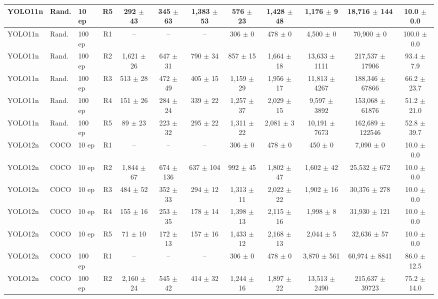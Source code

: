 \begin{table}[hbt!]
\begin{tabular}{lllccccccccc}
YOLO11n & Rand. & 10 ep & R5 & 292 $\pm$ 43 & 345 $\pm$ 63 & 1,383 $\pm$ 53 & 576 $\pm$ 23 & 1,428 $\pm$ 48 & 1,176 $\pm$ 9 & 18,716 $\pm$ 144 & 10.0 $\pm$ 0.0 \\
\midrule
YOLO11n & Rand. & 100 ep & R1 & {--} & {--} & {--} & 306 $\pm$ 0 & 478 $\pm$ 0 & 4,500 $\pm$ 0 & 70,900 $\pm$ 0 & 100.0 $\pm$ 0.0 \\
YOLO11n & Rand. & 100 ep & R2 & 1,621 $\pm$ 26 & 647 $\pm$ 31 & 790 $\pm$ 34 & 857 $\pm$ 15 & 1,664 $\pm$ 18 & 13,633 $\pm$ 1111 & 217,537 $\pm$ 17906 & 93.4 $\pm$ 7.9 \\
YOLO11n & Rand. & 100 ep & R3 & 513 $\pm$ 28 & 472 $\pm$ 49 & 405 $\pm$ 15 & 1,159 $\pm$ 29 & 1,956 $\pm$ 17 & 11,813 $\pm$ 4267 & 188,346 $\pm$ 67866 & 66.2 $\pm$ 23.7 \\
YOLO11n & Rand. & 100 ep & R4 & 151 $\pm$ 26 & 284 $\pm$ 24 & 339 $\pm$ 22 & 1,257 $\pm$ 37 & 2,029 $\pm$ 15 & 9,597 $\pm$ 3892 & 153,068 $\pm$ 61876 & 51.2 $\pm$ 21.0 \\
YOLO11n & Rand. & 100 ep & R5 & 89 $\pm$ 23 & 223 $\pm$ 32 & 295 $\pm$ 22 & 1,311 $\pm$ 22 & 2,081 $\pm$ 3 & 10,191 $\pm$ 7673 & 162,689 $\pm$ 122546 & 52.8 $\pm$ 39.7 \\
\midrule
YOLO12n & COCO & 10 ep & R1 & {--} & {--} & {--} & 306 $\pm$ 0 & 478 $\pm$ 0 & 450 $\pm$ 0 & 7,090 $\pm$ 0 & 10.0 $\pm$ 0.0 \\
YOLO12n & COCO & 10 ep & R2 & 1,844 $\pm$ 67 & 674 $\pm$ 136 & 637 $\pm$ 104 & 992 $\pm$ 45 & 1,802 $\pm$ 47 & 1,602 $\pm$ 42 & 25,532 $\pm$ 672 & 10.0 $\pm$ 0.0 \\
YOLO12n & COCO & 10 ep & R3 & 484 $\pm$ 52 & 352 $\pm$ 33 & 294 $\pm$ 12 & 1,313 $\pm$ 11 & 2,022 $\pm$ 22 & 1,902 $\pm$ 16 & 30,376 $\pm$ 278 & 10.0 $\pm$ 0.0 \\
YOLO12n & COCO & 10 ep & R4 & 155 $\pm$ 16 & 253 $\pm$ 35 & 178 $\pm$ 14 & 1,398 $\pm$ 13 & 2,115 $\pm$ 16 & 1,998 $\pm$ 8 & 31,930 $\pm$ 121 & 10.0 $\pm$ 0.0 \\
YOLO12n & COCO & 10 ep & R5 & 71 $\pm$ 10 & 172 $\pm$ 13 & 157 $\pm$ 16 & 1,433 $\pm$ 12 & 2,168 $\pm$ 13 & 2,044 $\pm$ 5 & 32,636 $\pm$ 57 & 10.0 $\pm$ 0.0 \\
\midrule
YOLO12n & COCO & 100 ep & R1 & {--} & {--} & {--} & 306 $\pm$ 0 & 478 $\pm$ 0 & 3,870 $\pm$ 561 & 60,974 $\pm$ 8841 & 86.0 $\pm$ 12.5 \\
YOLO12n & COCO & 100 ep & R2 & 2,160 $\pm$ 24 & 545 $\pm$ 42 & 414 $\pm$ 32 & 1,244 $\pm$ 16 & 1,897 $\pm$ 22 & 13,513 $\pm$ 2490 & 215,637 $\pm$ 39723 & 75.2 $\pm$ 14.0 \\

\end{tabular}
\end{table}
